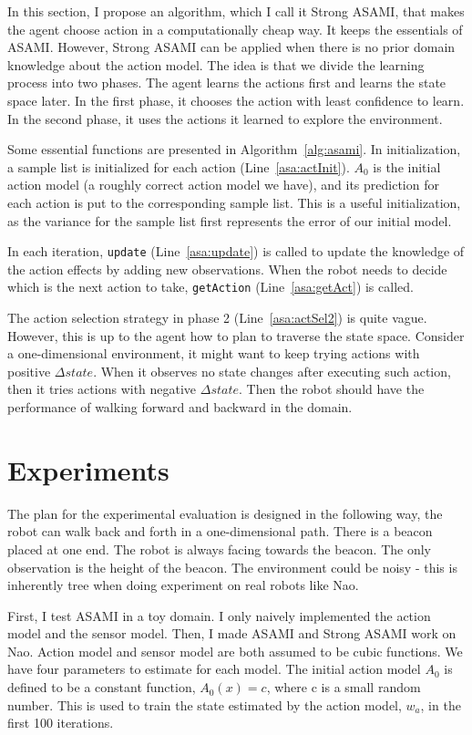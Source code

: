 \documentclass[10pt]{article}
\begin{document}
In this section, I propose an algorithm, which I call it Strong ASAMI,
that makes the agent choose action in a computationally cheap way.
It keeps the essentials of ASAMI. However, Strong ASAMI can be applied
when there is no prior domain knowledge about the action model. The
idea is that we divide the learning process into two phases. The agent
learns the actions first and learns the state space later. In the
first phase, it chooses the action with least confidence to learn. In
the second phase, it uses the actions it learned to explore the
environment.

Some essential functions are presented in Algorithm~\ref{alg:asami}.
In initialization, a sample list is initialized for each action
(Line~\ref{asa:actInit}). $A_0$ is the initial action model (a roughly
correct action model we have), and its prediction for each action is
put to the corresponding sample list.  This is a useful
initialization, as the variance for the sample list first represents
the error of our initial model.

In each iteration, \texttt{update} (Line~\ref{asa:update}) is called to update
the knowledge of the action effects by adding new observations. When
the robot needs to decide which is the next action to take,
\texttt{getAction} (Line~\ref{asa:getAct}) is called.

The action selection strategy in phase 2 (Line~\ref{asa:actSel2}) is
quite vague. However, this is up to the agent how to plan to traverse
the state space. Consider a one-dimensional environment, it might want
to keep trying actions with positive $\Delta state$. When it observes
no state changes after executing such action, then it tries actions
with negative $\Delta state$. Then the robot should have the
performance of walking forward and backward in the domain.

\section{Experiments}

The plan for the experimental evaluation is designed in the following
way, the robot can walk back and forth in a one-dimensional path.
There is a beacon placed at one end. The robot is always facing
towards the beacon. The only observation is the height of the beacon.
The environment could be noisy - this is inherently tree when doing
experiment on real robots like Nao.

First, I test ASAMI in a toy domain. I only naively implemented the action
model and the sensor model. Then, I made ASAMI and Strong ASAMI work on
Nao. Action model and sensor model are both assumed to be cubic
functions.  We have four parameters to estimate for each model. The
initial action model $A_0$ is defined to be a constant function,
$A_0(x) = c$, where c is a small random number. This is used to train
the state estimated by the action model, $w_a$, in the first 100
iterations.
\end{document}
